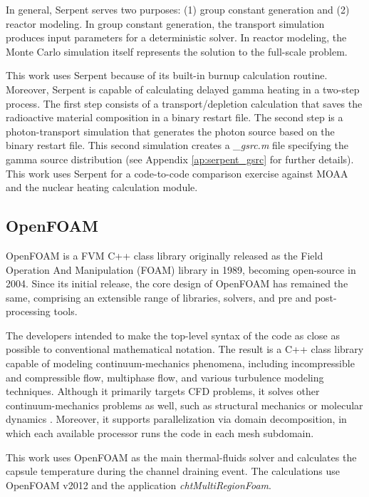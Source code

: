 In general, Serpent serves two purposes: (1) group constant generation and (2) reactor modeling.
In group constant generation, the transport simulation produces input parameters for a deterministic solver.
In reactor modeling, the Monte Carlo simulation itself represents the solution to the full-scale problem.

This work uses Serpent because of its built-in burnup calculation routine.
Moreover, Serpent is capable of calculating delayed gamma heating in a two-step process.
The first step consists of a transport/depletion calculation that saves the radioactive material composition in a binary restart file.
The second step is a photon-transport simulation that generates the photon source based on the binary restart file.
This second simulation creates a \textit{\_gsrc.m} file specifying the gamma source distribution (see Appendix \ref{ap:serpent_gsrc} for further details).
This work uses Serpent for a code-to-code comparison exercise against MOAA and the nuclear heating calculation module.


\subsection{OpenFOAM}

OpenFOAM \cite{weller_tensorial_1998} is a \gls*{FVM} C++ class library originally released as the Field Operation And Manipulation (FOAM) library in 1989, becoming open-source in 2004.
Since its initial release, the core design of OpenFOAM has remained the same, comprising an extensible  range of libraries, solvers, and pre and post-processing tools.

The developers intended to make the top-level syntax of the code as close as possible to conventional mathematical notation.
The result is a C++ class library capable of modeling continuum-mechanics phenomena, including incompressible and compressible flow, multiphase flow, and various turbulence modeling techniques.
Although it primarily targets \gls*{CFD} problems, it solves other continuum-mechanics problems as well, such as structural mechanics \cite{weller_tensorial_1998} or molecular dynamics \cite{longshaw_mdfoam_2018}.
Moreover, it supports parallelization via domain decomposition, in which each available processor runs the code in each mesh subdomain.

This work uses OpenFOAM as the main thermal-fluids solver and calculates the capsule temperature during the channel draining event.
The calculations use OpenFOAM v2012 and the application \textit{chtMultiRegionFoam}.


